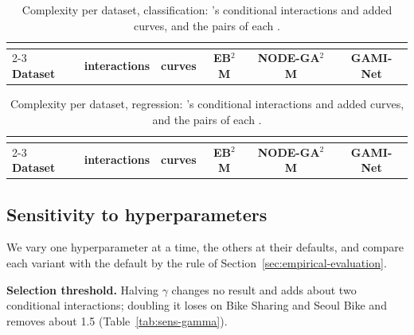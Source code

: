 \begin{table}[!htbp]
  \centering
  \caption{Complexity per dataset, classification: \method{}'s conditional interactions and added curves, and the pairs of each \gamm{}.}
  \label{tab:classification_interactions}
    \begin{tabular}{lccccc}
      \toprule
      & \multicolumn{2}{c}{\textbf{\method{}}} & & & \\
      \cmidrule(lr){2-3}
      \textbf{Dataset} & \textbf{interactions} & \textbf{curves} & \textbf{EB$^2$M} & \textbf{NODE-GA$^2$M} & \textbf{GAMI-Net} \\
      \midrule
      
    \end{tabular}
\end{table}

\begin{table}[!htbp]
  \centering
  \caption{Complexity per dataset, regression: \method{}'s conditional interactions and added curves, and the pairs of each \gamm{}.}
  \label{tab:regression_interactions}
    \begin{tabular}{lccccc}
      \toprule
      & \multicolumn{2}{c}{\textbf{\method{}}} & & & \\
      \cmidrule(lr){2-3}
      \textbf{Dataset} & \textbf{interactions} & \textbf{curves} & \textbf{EB$^2$M} & \textbf{NODE-GA$^2$M} & \textbf{GAMI-Net} \\
      \midrule
      
    \end{tabular}
\end{table}

\subsection{Sensitivity to hyperparameters}\label{app:sensitivity}
We vary one hyperparameter at a time, the others at their defaults, and compare each variant with the default \method{} by the rule of Section~\ref{sec:empirical-evaluation}.

\textbf{Selection threshold.}
Halving $\gamma$ changes no result and adds about two conditional interactions; doubling it loses on Bike Sharing and Seoul Bike and removes about 1.5 (Table~\ref{tab:sens-gamma}).

